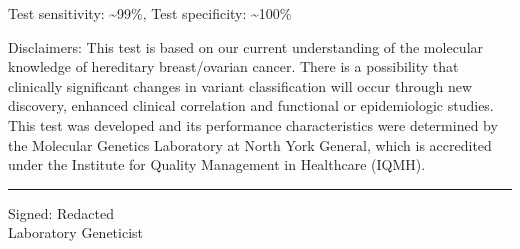\documentclass[10pt]{article}
\begin{document}
{Test sensitivity: \textasciitilde 99\%, Test specificity: \textasciitilde 100\%

Disclaimers:  This test is based on our current understanding of the molecular knowledge of hereditary breast/ovarian cancer. There is a possibility that clinically significant changes in variant classification will occur through new discovery, enhanced clinical correlation and functional or epidemiologic studies. This test was developed and its performance characteristics were determined by the Molecular Genetics Laboratory at North York General, which is accredited under the Institute for Quality Management in Healthcare (IQMH).
}

\vspace{4em}
\hfill \parbox{7cm}{
\rule{7cm}{1pt}
\small
Signed: Redacted \\
Laboratory Geneticist
}
\end{document}
